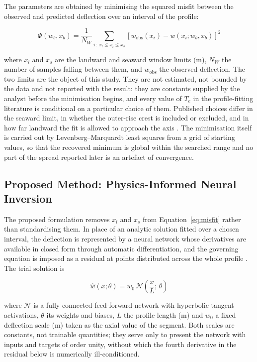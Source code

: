 \documentclass[final]{agujournal2019}
\begin{document}
The parameters are obtained by minimising the squared misfit between the
observed and predicted deflection over an interval of the profile:
\begin{linenomath*}
\begin{equation}
  \Phi\!\left(w_{b},x_{b}\right) =
  \frac{1}{N_{W}}\sum_{i\,:\,x_{l}\leq x_{i}\leq x_{s}}
  \left[w_{\mathrm{obs}}(x_{i}) - w(x_{i};w_{b},x_{b})\right]^{2}
  \label{eq:misfit}
\end{equation}
\end{linenomath*}
where $x_{l}$ and $x_{s}$ are the landward and seaward window limits (m),
$N_{W}$ the number of samples falling between them, and $w_{\mathrm{obs}}$ the
observed deflection. The two limits are the object of this study. They are not
estimated, not bounded by the data and not reported with the result: they are
constants supplied by the analyst before the minimisation begins, and every
value of $T_{e}$ in the profile-fitting literature is conditional on a
particular choice of them. Published choices differ in the seaward limit, in
whether the outer-rise crest is included or excluded, and in how far landward
the fit is allowed to approach the axis \cite{BryWhite2007,Manriquez2014}. The
minimisation itself is carried out by Levenberg--Marquardt least squares from a
grid of starting values, so that the recovered minimum is global within the
searched range and no part of the spread reported later is an artefact of
convergence.

\subsection{Proposed Method: Physics-Informed Neural Inversion}\label{sec:pinn}

The proposed formulation removes $x_{l}$ and $x_{s}$ from
Equation~\eqref{eq:misfit} rather than standardising them. In place of an
analytic solution fitted over a chosen interval, the deflection is represented
by a neural network whose derivatives are available in closed form through
automatic differentiation, and the governing equation is imposed as a residual
at points distributed across the whole profile
\cite{Raissi2019,Karniadakis2021}. The trial solution is
\begin{linenomath*}
\begin{equation}
  \hat{w}(x;\theta) = w_{0}\,
  \mathcal{N}\!\left(\frac{x}{L};\,\theta\right)
  \label{eq:trial}
\end{equation}
\end{linenomath*}
where $\mathcal{N}$ is a fully connected feed-forward network with hyperbolic
tangent activations, $\theta$ its weights and biases, $L$ the profile length (m)
and $w_{0}$ a fixed deflection scale (m) taken as the axial value of the
segment. Both scales are constants, not trainable quantities; they serve only to
present the network with inputs and targets of order unity, without which the
fourth derivative in the residual below is numerically ill-conditioned.
\end{document}
